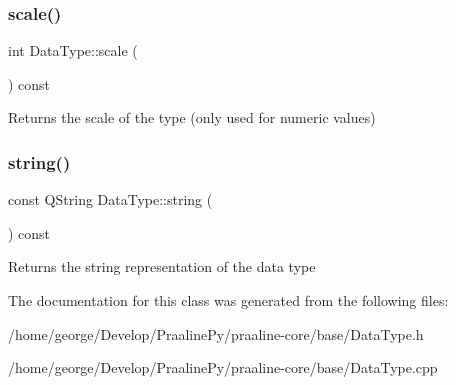 \subsubsection{\texorpdfstring{scale()}{scale()}}
{\footnotesize\ttfamily int Data\+Type\+::scale (\begin{DoxyParamCaption}{ }\end{DoxyParamCaption}) const}

\begin{DoxyReturn}{Returns}
the scale of the type (only used for numeric values) 
\end{DoxyReturn}
\mbox{\label{class_data_type_a61123733098ff8d26bef2a6a6401db83}} 
\subsubsection{\texorpdfstring{string()}{string()}}
{\footnotesize\ttfamily const Q\+String Data\+Type\+::string (\begin{DoxyParamCaption}{ }\end{DoxyParamCaption}) const}

\begin{DoxyReturn}{Returns}
the string representation of the data type 
\end{DoxyReturn}


The documentation for this class was generated from the following files\+:\begin{DoxyCompactItemize}
\item 
/home/george/\+Develop/\+Praaline\+Py/praaline-\/core/base/Data\+Type.\+h\item 
/home/george/\+Develop/\+Praaline\+Py/praaline-\/core/base/Data\+Type.\+cpp\end{DoxyCompactItemize}
